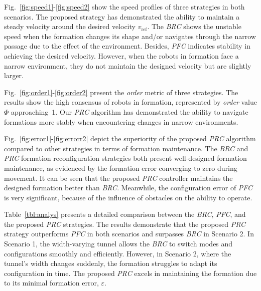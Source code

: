 Fig.~\ref{fig:speed1}-\ref{fig:speed2} show the speed profiles of three strategies in both scenarios. The proposed strategy has demonstrated the ability to maintain a steady velocity around the desired velocity $v_\text{ref}$. The \textit{BRC} shows the unstable speed when the formation changes its shape and/or navigates through the narrow passage due to the effect of the environment. Besides, \textit{PFC} indicates stability in achieving the desired velocity. However, when the robots in formation face a narrow environment, they do not maintain the designed velocity but are slightly larger.

Fig.~\ref{fig:order1}-\ref{fig:order2} present the \textit{order} metric of three strategies. The results show the high consensus of robots in formation, represented by \textit{order} value $\Phi$ approaching~1. Our \textit{PRC} algorithm has demonstrated the ability to navigate formations more stably when encountering changes in narrow environments.

Fig.~\ref{fig:error1}-\ref{fig:errorr2} depict the superiority of the proposed \textit{PRC} algorithm compared to other strategies in terms of formation maintenance. The \textit{BRC} and \textit{PRC} formation reconfiguration strategies both present well-designed formation maintenance, as evidenced by the formation error converging to zero during movement. It can be seen that the proposed \textit{PRC} controller maintains the designed formation better than \textit{BRC}. Meanwhile, the configuration error of \textit{PFC} is very significant, because of the influence of obstacles on the ability to operate.

Table~\ref{tbl:analys} presents a detailed comparison between the \textit{BRC}, \textit{PFC}, and the proposed \textit{PRC} strategies. The results demonstrate that the proposed \textit{PRC} strategy outperforms \textit{PFC} in both scenarios and surpasses \textit{BRC} in Scenario 2. In Scenario 1, the width-varying tunnel allows the \textit{BRC} to switch modes and configurations smoothly and efficiently. However, in Scenario 2, where the tunnel's width changes suddenly, the formation struggles to adapt its configuration in time. The proposed \textit{PRC} excels in maintaining the formation due to its minimal formation error, $\varepsilon$.

